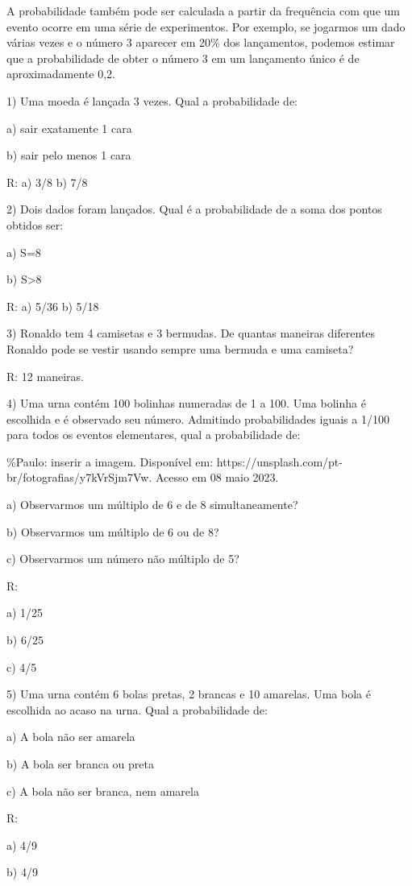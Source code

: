 A probabilidade também pode ser calculada a partir da frequência com que
um evento ocorre em uma série de experimentos. Por exemplo, se jogarmos
um dado várias vezes e o número 3 aparecer em 20\% dos lançamentos,
podemos estimar que a probabilidade de obter o número 3 em um lançamento
único é de aproximadamente 0,2.


1) Uma moeda é lançada 3 vezes. Qual a probabilidade de:

a) sair exatamente 1 cara

b) sair pelo menos 1 cara

R: a) 3/8 b) 7/8

2) Dois dados foram lançados. Qual é a probabilidade de a soma dos
pontos obtidos ser:

a) S=8

b) S\textgreater8

R: a) 5/36 b) 5/18

3) Ronaldo tem 4 camisetas e 3 bermudas. De quantas maneiras diferentes
Ronaldo pode se vestir usando sempre uma bermuda e uma camiseta?

R: 12 maneiras.

4) Uma urna contém 100 bolinhas numeradas de 1 a 100. Uma bolinha é
escolhida e é observado seu número. Admitindo probabilidades iguais a
1/100 para todos os eventos elementares, qual a probabilidade de:

\%Paulo: inserir a imagem. Disponível em:
https://unsplash.com/pt-br/fotografias/y7kVrSjm7Vw. Acesso em 08 maio
2023.

a) Observarmos um múltiplo de 6 e de 8 simultaneamente?

b) Observarmos um múltiplo de 6 ou de 8?

c) Observarmos um número não múltiplo de 5?

R:

a) 1/25

b) 6/25

c) 4/5

5) Uma urna contém 6 bolas pretas, 2 brancas e 10 amarelas. Uma bola é
escolhida ao acaso na urna. Qual a probabilidade de:

a) A bola não ser amarela

b) A bola ser branca ou preta

c) A bola não ser branca, nem amarela

R:

a) 4/9

b) 4/9

